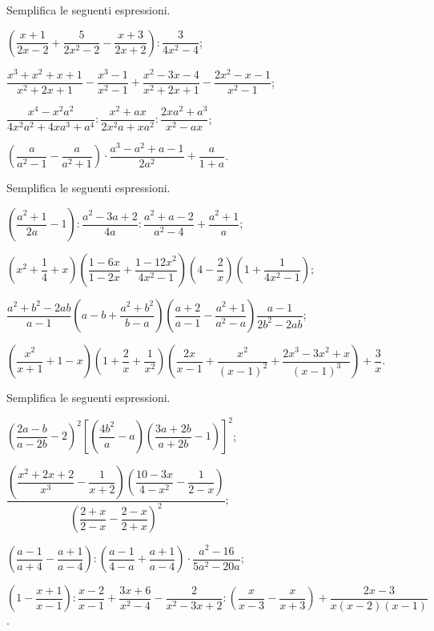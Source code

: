 \begin{esercizio}%
Semplifica le seguenti espressioni.
\begin{enumeratea}
 \item $\left(\dfrac{x+1}{2x-2}+\dfrac{5}{2x^{2}-2}-\dfrac{x+3}{2x+2}\right):\dfrac{3}{4x^{2}-4}$;
 \item $\dfrac{x^{3}+x^{2}+x+1}{x^{2}+2x+1}-\dfrac{x^{3}-1}{x^{2}-1}+\dfrac{x^{2}-3x-4}{x^{2}+2x+1}-\dfrac{2x^{2}-x-1}{x^{2}-1}$;
 \item $\dfrac{x^{4}-x^{2}a^{2}}{4x^{2}a^{2}+4xa^{3}+a^{4}}:\dfrac{x^{2}+ax}{2x^{2}a+xa^{2}}:\dfrac{2xa^{2}+a^{3}}{x^{2}-ax}$;
 \item $\left(\dfrac{a}{a^{2}-1}-\dfrac{a}{a^{2}+1}\right)\cdot\dfrac{a^{3}-a^{2}+a-1}{2a^{2}}+\dfrac{a}{1+a}$.
\end{enumeratea}
\end{esercizio}

\begin{esercizio}[\Ast]
Semplifica le seguenti espressioni.
\begin{enumeratea}
 \item $\left(\dfrac{a^{2}+1}{2a}-1\right):\dfrac{a^{2}-3a+2}{4a}:\dfrac{a^{2}+a-2}{a^{2}-4}+\dfrac{a^{2}+1}{a}$;
 \item $\left(x^{2}+\dfrac{1}{4}+x\right)\left(\dfrac{1-6x}{1-2x}+\dfrac{1-12x^{2}}{4x^{2}-1}\right)\left(4-\dfrac{2}{x}\right)\left(1+\dfrac{1}{4x^{2}-1}\right)$;
 \item $\dfrac{a^{2}+b^{2}-2ab}{a-1}\left(a-b+\dfrac{a^{2}+b^{2}}{b-a}\right)\left(\dfrac{a+2}{a-1}-\dfrac{a^{2}+1}{a^{2}-a}\right)\dfrac{a-1}{2b^{2}-2ab}$;
 \item $\left(\dfrac{x^{2}}{x+1}+1-x\right)\left(1+\dfrac{2}{x}+\dfrac{1}{x^{2}}\right)\left(\dfrac{2x}{x-1}+\dfrac{x^{2}}{(x-1)^{2}}+\dfrac{2x^{3}-3x^{2}+x}{(x-1)^{3}}\right)+\dfrac{3}{x}$.
\end{enumeratea}
\end{esercizio}

\begin{esercizio}[\Ast]
Semplifica le seguenti espressioni.
\begin{enumeratea}
 \item $\left(\dfrac{2a-b}{a-2b}-2\right)^{2}\left[\left(\dfrac{4b^{2}}{a}-a\right)\left(\dfrac{3a+2b}{a+2b}-1\right)\right]^{2}$;
 \item $\dfrac{\left(\dfrac{x^{2}+2x+2}{x^{3}}-\dfrac{1}{x+2}\right)\left(\dfrac{10-3x}{4-x^{2}}-\dfrac{1}{2-x}\right)}{\left(\dfrac{2+x}{2-x}-\dfrac{2-x}{2+x}\right)^{2}}$;
 \item $\left(\dfrac{a-1}{a+4}-\dfrac{a+1}{a-4}\right):\left(\dfrac{a-1}{4-a}+\dfrac{a+1}{a-4}\right)\cdot {\dfrac{a^{2}-16}{5a^{2}-20a}}$;
 \item $\left(1-\dfrac{x+1}{x-1}\right):\dfrac{x-2}{x-1}+\dfrac{3x+6}{x^{2}-4}-\dfrac{2}{x^{2}-3x+2}: {\left(\dfrac{x}{x-3}-\dfrac{x}{x+3}\right)}+\dfrac{2x-3}{x(x-2)(x-1)}$.
\end{enumeratea}
\end{esercizio}

